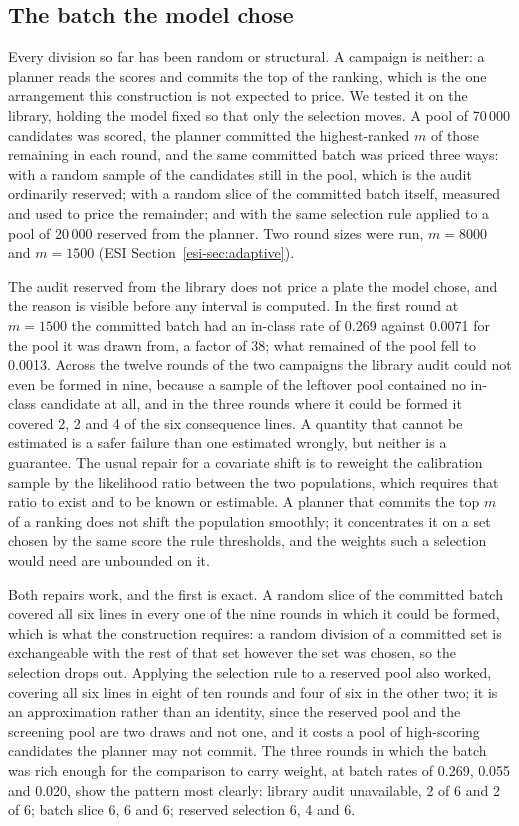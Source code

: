 \documentclass[twocolumn,10pt]{article}
\begin{document}
\subsection{The batch the model chose}
\label{sec:results:adaptive}

Every division so far has been random or structural. A campaign is neither: a planner reads
the scores and commits the top of the ranking, which is the one arrangement this construction
is not expected to price. We tested it on the library, holding the model fixed so that only
the selection moves. A pool of 70\,000 candidates was scored, the planner committed the
highest-ranked $m$ of those remaining in each round, and the same committed batch was priced
three ways: with a random sample of the candidates still in the pool, which is the audit ordinarily reserved; with a random slice of the committed batch itself, measured and used to
price the remainder; and with the same selection rule applied to a pool of 20\,000 reserved
from the planner. Two round sizes were run, $m=8000$ and $m=1500$ (ESI Section~\ref{esi-sec:adaptive}).

The audit reserved from the library does not price a plate the model chose, and the reason is
visible before any interval is computed. In the first round at $m=1500$ the committed batch
had an in-class rate of 0.269 against 0.0071 for the pool it was drawn from, a factor of 38;
what remained of the pool fell to 0.0013. Across the twelve rounds of the two campaigns the
library audit could not even be formed in nine, because a sample of the leftover pool
contained no in-class candidate at all, and in the three rounds where it could be formed it
covered 2, 2 and 4 of the six consequence lines. A quantity that cannot be estimated is a
safer failure than one estimated wrongly, but neither is a guarantee. The usual repair for a
covariate shift is to reweight the calibration sample by the likelihood ratio between the two
populations,\citep{Tibshirani2019Weighted} which requires that ratio to exist and to be known
or estimable. A planner that commits the top $m$ of a ranking does not shift the population
smoothly; it concentrates it on a set chosen by the same score the rule thresholds, and the
weights such a selection would need are unbounded on it.

Both repairs work, and the first is exact. A random slice of the committed batch covered all
six lines in every one of the nine rounds in which it could be formed, which is what the
construction requires: a random division of a committed set is exchangeable with the rest of
that set however the set was chosen, so the selection drops out. Applying the selection rule
to a reserved pool also worked, covering all six lines in eight of ten rounds and four of six
in the other two; it is an approximation rather than an identity, since the reserved pool and the screening pool are two draws and not one, and it costs a pool of high-scoring
candidates the planner may not commit. The three rounds in which the batch was rich enough for
the comparison to carry weight, at batch rates of 0.269, 0.055 and 0.020, show the pattern
most clearly: library audit unavailable, 2 of 6 and 2 of 6; batch slice 6, 6 and 6; reserved
selection 6, 4 and 6.
\end{document}
